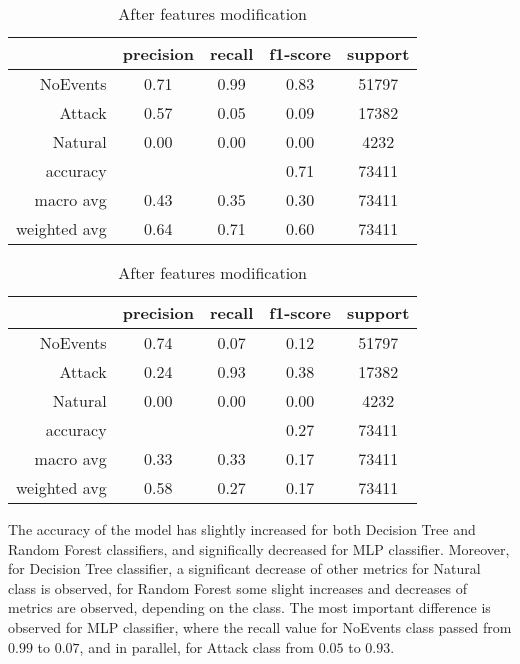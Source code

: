 \begin{table}[H]
    \centering
    \footnotesize
    \caption{Features modification results for MLP classifier} \label{tab:fm_mlp}
    \begin{subtable}[t]{.5\linewidth}
        \centering
        \caption{Before features modification} 
        \begin{tabular}{rcccc}\toprule
            & precision    &recall & f1-score  & support \\\midrule
            NoEvents   &    0.71 &     0.99 &     0.83&    51797\\
            Attack     &  0.57   &   0.05   &   0.09  &   17382\\
           Natural     &  0.00   &   0.00   &   0.00  &    4232\\    
          accuracy     &         &          &   0.71  &   73411\\
         macro avg     &  0.43   &   0.35   &   0.30  &   73411\\
      weighted avg     &  0.64   &   0.71   &   0.60  &   73411\\ \bottomrule
        \end{tabular}
    \end{subtable}%
    \begin{subtable}[t]{.5\linewidth}
        \centering
        \caption{After features modification}
        \begin{tabular}{rcccc}\toprule
            &precision   & recall & f1-score &  support  \\\midrule
            NoEvents   &    0.74  &    0.07 &     0.12 &  51797\\
            Attack     &  0.24    &  0.93   &   0.38   &  17382\\
           Natural     &  0.00    &  0.00   &   0.00   &   4232\\   
          accuracy     &          &         &   0.27   &  73411\\
         macro avg     &  0.33    &  0.33   &   0.17   &  73411\\
      weighted avg     &  0.58    &  0.27   &   0.17   &  73411\\    \bottomrule   
        \end{tabular}
    \end{subtable}
\end{table}

The accuracy of the model has slightly increased for both Decision Tree and Random Forest classifiers, and significally decreased for MLP classifier. Moreover, for Decision Tree classifier, a significant decrease of other metrics for Natural class is observed, for Random Forest some slight increases and decreases of metrics are observed, depending on the class. The most important difference is observed for MLP classifier, where the recall value for NoEvents class passed from $0.99$ to $0.07$, and in parallel, for Attack class from $0.05$ to $0.93$.

